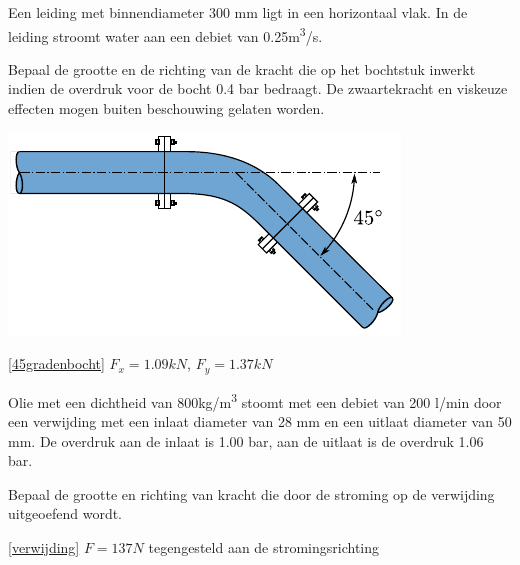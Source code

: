 \begin{toepassing}[*]
	\label{45gradenbocht}
Een leiding met binnendiameter 300 mm ligt in een horizontaal vlak. In de leiding stroomt water aan een debiet van 0.25\unit{m^3/s}.

Bepaal de grootte en de richting van de kracht die op het bochtstuk inwerkt indien de overdruk voor de bocht 0.4 bar bedraagt. De zwaartekracht en viskeuze effecten mogen buiten beschouwing gelaten worden.

	\centering
	\includegraphics{fig/behoudsvergelijkingen/45gradenbocht}
\end{toepassing}
\begin{antwoord}{\ref{45gradenbocht}}
	$F_x = 1.09\unit{kN}$, $F_y = 1.37\unit{kN}$
\end{antwoord}
\begin{toepassing}[*]
	\label{verwijding}
Olie met een dichtheid van 800\unit{kg/m^3} stoomt met een debiet van 200 l/min door een verwijding met een inlaat diameter van 28 mm en een uitlaat diameter van 50 mm. De overdruk aan de inlaat is 1.00 bar, aan de uitlaat is de overdruk 1.06 bar.

Bepaal de grootte en richting van kracht die door de stroming op de verwijding uitgeoefend wordt.
\end{toepassing}
\begin{antwoord}{\ref{verwijding}}
	$F = 137\unit{N}$ tegengesteld aan de stromingsrichting
\end{antwoord}
